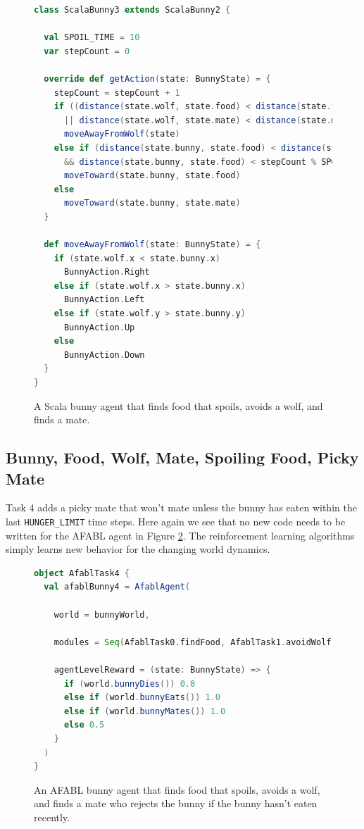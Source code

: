 \begin{figure}[h]
\begin{lstlisting}[language=Scala]
class ScalaBunny3 extends ScalaBunny2 {

  val SPOIL_TIME = 10
  var stepCount = 0

  override def getAction(state: BunnyState) = {
    stepCount = stepCount + 1
    if ((distance(state.wolf, state.food) < distance(state.food, state.bunny))
      || distance(state.wolf, state.mate) < distance(state.mate, state.bunny))
      moveAwayFromWolf(state)
    else if (distance(state.bunny, state.food) < distance(state.bunny, state.mate)
      && distance(state.bunny, state.food) < stepCount % SPOIL_TIME)
      moveToward(state.bunny, state.food)
    else
      moveToward(state.bunny, state.mate)
  }

  def moveAwayFromWolf(state: BunnyState) = {
    if (state.wolf.x < state.bunny.x)
      BunnyAction.Right
    else if (state.wolf.x > state.bunny.x)
      BunnyAction.Left
    else if (state.wolf.y > state.bunny.y)
      BunnyAction.Up
    else
      BunnyAction.Down
  }
}
\end{lstlisting}
\caption{A Scala bunny agent that finds food that spoils, avoids a wolf, and finds a mate.}
\label{fig:scala3}
\end{figure}


\subsection{Bunny, Food, Wolf, Mate, Spoiling Food, Picky Mate}

Task 4 adds a picky mate that won't mate unless the bunny has eaten within the last {\tt HUNGER\_LIMIT} time steps. Here again we see that no new code needs to be written for the AFABL agent in Figure \ref{fig:afabl4}. The reinforcement learning algorithms simply learns new behavior for the changing world dynamics.

\begin{figure}[h]
\begin{lstlisting}[language=Scala]
object AfablTask4 {
  val afablBunny4 = AfablAgent(

    world = bunnyWorld,

    modules = Seq(AfablTask0.findFood, AfablTask1.avoidWolf, AfablTask2.findMate),

    agentLevelReward = (state: BunnyState) => {
      if (world.bunnyDies()) 0.0
      else if (world.bunnyEats()) 1.0
      else if (world.bunnyMates()) 1.0
      else 0.5
    }
  )
}
\end{lstlisting}
\caption{An AFABL bunny agent that finds food that spoils, avoids a wolf, and finds a mate who rejects the bunny if the bunny hasn't eaten recently.}
\label{fig:afabl4}
\end{figure}

